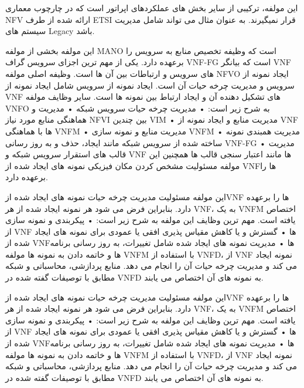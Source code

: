 \documentclass{book}
\begin{document}

این مولفه، ترکیبی از سایر بخش های عملکردهای اپراتور است که در چارچوب معماری NFV ارائه شده از طرف ETSI قرار نمیگیرند. به عنوان مثال می تواند شامل مدیریت سیستم های Legacy باشد.


این مولفه بخشی از مولفه MANO است که وظیفه تخصیص منابع به سرویس را برعهده دارد. یکی از مهم ترین اجزای سرویس گراف VNF-FG است که بیانگر VNF های سرویس و ارتباطات بین آن ها است. وظیفه اصلی مولفه NFVO ایجاد نمونه از سرویس و مدیریت چرخه حیات آن است. ایجاد نمونه از سرویس شامل ایجاد نمونه از VNF های تشکیل دهنده آن و ایجاد ارتباط بین نمونه ها است. سایر وظایف مولفه VNFO به شرح زیر است:
    • مدیریت چرخه حیات سرویس شبکه
    • مدیریت و هماهنگی منابع مورد نیاز NFVI بین چندین VIM
    • مدیریت منابع و ایجاد نمونه از VNF ها با هماهنگی VNFM
    • مدیریت منابع و نمونه سازی VNFM
    • مدیریت همبندی نمونه ساخته شده از سرویس شبکه مانند ایجاد، حذف و به روز رسانی VNF-FG
    • مدیریت قالب های استقرار سرویس شبکه و VNF ها مانند اعتبار سنجی قالب ها
همچنین این مولفه مسئولیت مشخص کردن مکان فیزیکی نمونه های ایجاد شده از VNFها را برعهده دارد.


این مولفه مسئولیت مدیریت چرخه حیات نمونه های ایجاد شده ازVNF ها را برعهده دارد. بنابراین فرض می شود هر نمونه ایجاد شده از هر VNF، به یک VNFM اختصاص یافته است. مهم ترین وظایف این مولفه به شرح زیر است:
    • پیکربندی و نمونه سازی از VNF ها
    • گسترش و یا کاهش مقیاس پذیری افقی یا عمودی برای نمونه های ایجاد شده از VNFها
    • مدیریت نمونه های ایجاد شده شامل  تغییرات، به روز رسانی برنامه ها و خاتمه دادن به نمونه ها
مولفه VNFM با استفاده از VNFD، از VNF نمونه ایجاد می کند و مدیریت چرخه حیات آن را انجام می دهد. منابع پردازشی، محاسباتی و شبکه مطابق با توصیفات گفته شده در VNFD به نمونه های آن اختصاص می یابند.


این مولفه مسئولیت مدیریت چرخه حیات نمونه های ایجاد شده ازVNF ها را برعهده دارد. بنابراین فرض می شود هر نمونه ایجاد شده از هر VNF، به یک VNFM اختصاص یافته است. مهم ترین وظایف این مولفه به شرح زیر است:
    • پیکربندی و نمونه سازی از VNF ها
    • گسترش و یا کاهش مقیاس پذیری افقی یا عمودی برای نمونه های ایجاد شده از VNFها
    • مدیریت نمونه های ایجاد شده شامل  تغییرات، به روز رسانی برنامه ها و خاتمه دادن به نمونه ها
مولفه VNFM با استفاده از VNFD، از VNF نمونه ایجاد می کند و مدیریت چرخه حیات آن را انجام می دهد. منابع پردازشی، محاسباتی و شبکه مطابق با توصیفات گفته شده در VNFD به نمونه های آن اختصاص می یابند.
\end{document}
